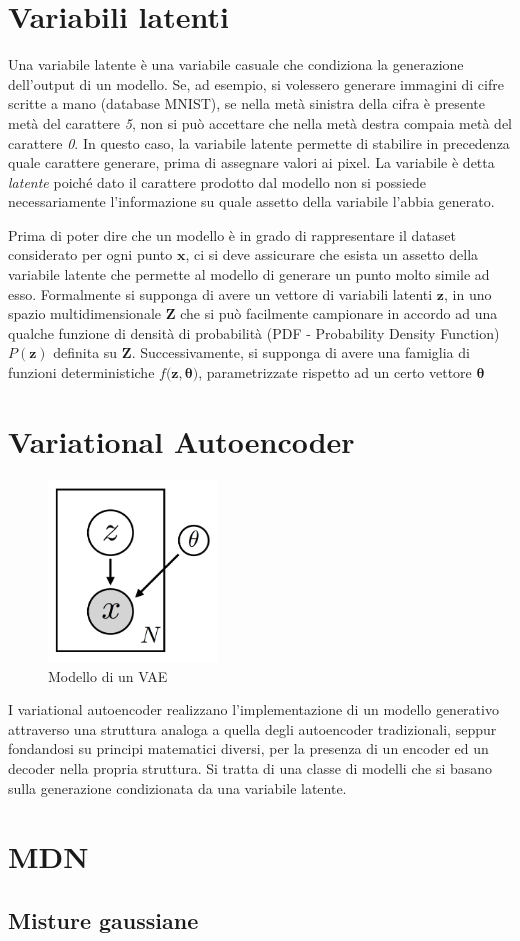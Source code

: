 \section{Variabili latenti} %
\label{sec:variabili_latenti}
Una variabile latente è una variabile casuale che condiziona la generazione dell'output di un modello. Se, ad esempio, si volessero generare immagini di cifre scritte a mano (database MNIST), se nella metà sinistra della cifra è presente metà del carattere \textit{5}, non si può accettare che nella metà destra compaia metà del carattere \textit{0}. In questo caso, la variabile latente permette di stabilire in precedenza quale carattere generare, prima di assegnare valori ai pixel. La variabile è detta \textit{latente} poiché dato il carattere prodotto dal modello non si possiede necessariamente l'informazione su quale assetto della variabile l'abbia generato. 

Prima di poter dire che un modello è in grado di rappresentare il dataset considerato per ogni punto $\boldsymbol{x}$, ci si deve assicurare che esista un assetto della variabile latente che permette al modello di generare un punto molto simile ad esso. Formalmente si supponga di avere un vettore di variabili latenti $\boldsymbol{z}$, in uno spazio multidimensionale $\boldsymbol{Z}$ che si può facilmente campionare in accordo ad una qualche funzione di densità di probabilità (PDF - Probability Density Function) $P(\boldsymbol{z})$ definita su $\boldsymbol{Z}$. Successivamente, si supponga di avere una famiglia di funzioni deterministiche $f(\boldsymbol{z}, \boldsymbol{\theta)}$, parametrizzate rispetto ad un certo vettore $\boldsymbol{\theta}$
\section{Variational Autoencoder}
\begin{figure}[ht]
	\centering
	\includegraphics[width=0.4\textwidth]{img/vae_model.png}
	\caption{Modello di un VAE}
	\label{fig:1.13}
\end{figure}
I variational autoencoder realizzano l'implementazione di un modello generativo attraverso una struttura analoga a quella degli autoencoder tradizionali, seppur fondandosi su principi matematici diversi, per la presenza di un encoder ed un decoder nella propria struttura. Si tratta di una classe di modelli che si basano sulla generazione condizionata da una variabile latente.

\section{MDN}
\subsection{Misture gaussiane} %
\label{sub:misture_gaussiane}

